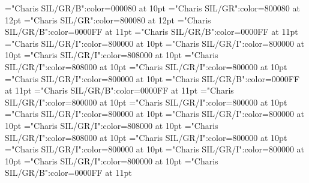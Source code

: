 \documentclass[a4paper,twoside]{article}
\begin{document}
\font\spanheadwordconfigtargetconfigtargetsminimallexreferenceminimallexreferencesmainentrycomplex="Charis SIL/GR/B":color=000080 at 10pt
\font\spanesliteralmeaningmainentrycomplex="Charis SIL/GR":color=800080 at 12pt
\font\spanliteralmeaningmainentrycomplex="Charis SIL/GR":color=800080 at 12pt
\font\spanmxbheadwordvisiblecomplexformbackrefvisiblecomplexformbackrefsmainentrycomplex="Charis SIL/GR/B":color=0000FF at 11pt
\font\spanheadwordvisiblecomplexformbackrefvisiblecomplexformbackrefsmainentrycomplex="Charis SIL/GR/B":color=0000FF at 11pt
\font\spanespartofspeechmorphosyntaxanalysesvisiblecomplexformbackrefsmainentrycomplex="Charis SIL/GR/I":color=800000 at 10pt
\font\spanpartofspeechmorphosyntaxanalysesvisiblecomplexformbackrefsmainentrycomplex="Charis SIL/GR/I":color=800000 at 10pt
\font\spanessummaryvisiblecomplexformbackrefsmainentrycomplex="Charis SIL/GR/I":color=808000 at 10pt
\font\spansummaryvisiblecomplexformbackrefsmainentrycomplex="Charis SIL/GR/I":color=808000 at 10pt
\font\spanmxbheadwordreferencedentryreferencedentriesvisiblevariantentryrefsmainentrycomplex="Charis SIL/GR/I":color=800000 at 10pt
\font\spanheadwordreferencedentryreferencedentriesvisiblevariantentryrefsmainentrycomplex="Charis SIL/GR/I":color=800000 at 10pt
\font\spanmxbheadwordminorentryvariant="Charis SIL/GR/B":color=0000FF at 11pt
\font\spanheadwordminorentryvariant="Charis SIL/GR/B":color=0000FF at 11pt
\font\spanesreverseabbrvariantentrytypesvisiblevariantentryrefsminorentryvariant="Charis SIL/GR/I":color=800000 at 10pt
\font\spanreverseabbrvariantentrytypesvisiblevariantentryrefsminorentryvariant="Charis SIL/GR/I":color=800000 at 10pt
\font\spanmxbheadwordreferencedentryreferencedentriesvisiblevariantentryrefsminorentryvariant="Charis SIL/GR/I":color=800000 at 10pt
\font\spanheadwordreferencedentryreferencedentriesvisiblevariantentryrefsminorentryvariant="Charis SIL/GR/I":color=800000 at 10pt
\font\spanesrestrictionsminorentryvariant="Charis SIL/GR/I":color=808000 at 10pt
\font\spanrestrictionsminorentryvariant="Charis SIL/GR/I":color=808000 at 10pt
\font\spanescommentminorentryvariant="Charis SIL/GR/I":color=800000 at 10pt
\font\spancommentminorentryvariant="Charis SIL/GR/I":color=800000 at 10pt
\font\spanesabbreviationvariantentrytypevariantentrytypesvariantformentrybackrefsminorentryvariant="Charis SIL/GR/I":color=800000 at 10pt
\font\spanabbreviationvariantentrytypevariantentrytypesvariantformentrybackrefsminorentryvariant="Charis SIL/GR/I":color=800000 at 10pt
\font\spanmxbheadwordvariantformentrybackrefvariantformentrybackrefsminorentryvariant="Charis SIL/GR/B":color=0000FF at 11pt
\end{document}
